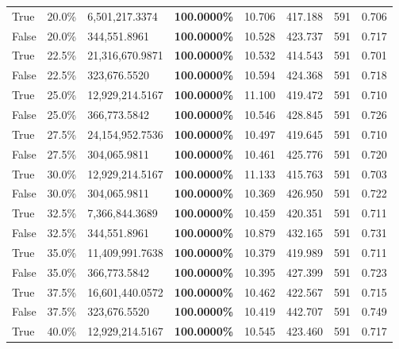\begin{table}[H]
\begin{tabular}{lllrllll}
\cline{1-8}
True & 20.0\% & 6,501,217.3374 & \bfseries \color{red} 100.0000\% & 10.706 & 417.188 & 591 & 0.706 \\
\cline{1-8}
False & 20.0\% & 344,551.8961 & \bfseries \color{red} 100.0000\% & 10.528 & 423.737 & 591 & 0.717 \\
\cline{1-8}
True & 22.5\% & 21,316,670.9871 & \bfseries \color{red} 100.0000\% & 10.532 & 414.543 & 591 & 0.701 \\
\cline{1-8}
False & 22.5\% & 323,676.5520 & \bfseries \color{red} 100.0000\% & 10.594 & 424.368 & 591 & 0.718 \\
\cline{1-8}
True & 25.0\% & 12,929,214.5167 & \bfseries \color{red} 100.0000\% & 11.100 & 419.472 & 591 & 0.710 \\
\cline{1-8}
False & 25.0\% & 366,773.5842 & \bfseries \color{red} 100.0000\% & 10.546 & 428.845 & 591 & 0.726 \\
\cline{1-8}
True & 27.5\% & 24,154,952.7536 & \bfseries \color{red} 100.0000\% & 10.497 & 419.645 & 591 & 0.710 \\
\cline{1-8}
False & 27.5\% & 304,065.9811 & \bfseries \color{red} 100.0000\% & 10.461 & 425.776 & 591 & 0.720 \\
\cline{1-8}
True & 30.0\% & 12,929,214.5167 & \bfseries \color{red} 100.0000\% & 11.133 & 415.763 & 591 & 0.703 \\
\cline{1-8}
False & 30.0\% & 304,065.9811 & \bfseries \color{red} 100.0000\% & 10.369 & 426.950 & 591 & 0.722 \\
\cline{1-8}
True & 32.5\% & 7,366,844.3689 & \bfseries \color{red} 100.0000\% & 10.459 & 420.351 & 591 & 0.711 \\
\cline{1-8}
False & 32.5\% & 344,551.8961 & \bfseries \color{red} 100.0000\% & 10.879 & 432.165 & 591 & 0.731 \\
\cline{1-8}
True & 35.0\% & 11,409,991.7638 & \bfseries \color{red} 100.0000\% & 10.379 & 419.989 & 591 & 0.711 \\
\cline{1-8}
False & 35.0\% & 366,773.5842 & \bfseries \color{red} 100.0000\% & 10.395 & 427.399 & 591 & 0.723 \\
\cline{1-8}
True & 37.5\% & 16,601,440.0572 & \bfseries \color{red} 100.0000\% & 10.462 & 422.567 & 591 & 0.715 \\
\cline{1-8}
False & 37.5\% & 323,676.5520 & \bfseries \color{red} 100.0000\% & 10.419 & 442.707 & 591 & 0.749 \\
\cline{1-8}
True & 40.0\% & 12,929,214.5167 & \bfseries \color{red} 100.0000\% & 10.545 & 423.460 & 591 & 0.717 \\

\end{tabular}
\end{table}
